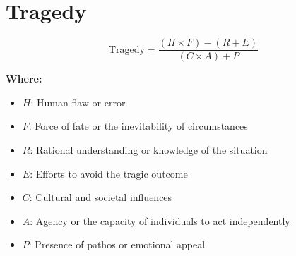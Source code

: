 \chapter{Tragedy}

\begin{equation}
\text{Tragedy} = \frac{(H \times F) - (R + E)}{(C \times A) + P}
\end{equation}

\textbf{Where:}

\begin{itemize}
    \item $H$: Human flaw or error
    \item $F$: Force of fate or the inevitability of circumstances
    \item $R$: Rational understanding or knowledge of the situation
    \item $E$: Efforts to avoid the tragic outcome
    \item $C$: Cultural and societal influences
    \item $A$: Agency or the capacity of individuals to act independently
    \item $P$: Presence of pathos or emotional appeal
\end{itemize}